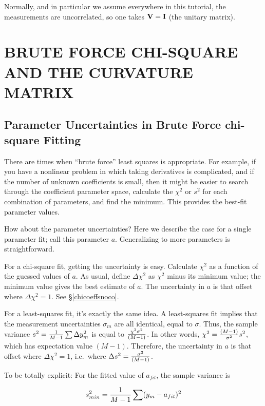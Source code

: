 \documentclass[psfig,preprint]{aastex}
\begin{document}
	Normally, and in particular we assume everywhere in this
tutorial, the measurements are uncorrelated, so one takes ${\bf V} =
{\bf I}$ (the unitary matrix). 


\section{BRUTE FORCE CHI-SQUARE AND THE CURVATURE MATRIX}

\subsection{Parameter Uncertainties in Brute Force chi-square Fitting}

	There are times when ``brute force'' least squares is
appropriate.  For example, if you have a nonlinear problem in which
taking derivatives is complicated, and if the number of unknown
coefficients is small, then it might be easier to search through the
coefficient parameter space, calculate the $\chi^2$ or $s^2$ for each
combination of parameters, and find the minimum. This provides the
best-fit parameter values. 

	How about the parameter uncertainties? Here we describe the case
for a single parameter fit; call this parameter $a$. Generalizing to
more parameters is straightforward.

	For a chi-square fit, getting the uncertainty is easy. Calculate
$\chi^2$ as a function of the guessed values of $a$. As usual, define
$\Delta \chi^2$ as $\chi^2$ minus its minimum value; the minimum value
gives the best estimate of $a$. The uncertainty in $a$ is that offset
where $\Delta \chi^2 = 1$. See \S \ref{chicoeffsnoco}.

	For a least-squares fit, it's exactly the same idea. A
least-squares fit implies that the measurement uncertainties $\sigma_m$
are all identical, equal to $\sigma$. Thus, the sample variance $s^2 =
{1 \over M-1} \sum \Delta y_m^2$ is equal to $\chi^2 \sigma^2 \over
(M-1)$. In other words, $\chi^2 = {(M-1) \over \sigma^2} s^2$, which has
expectation value $(M-1)$. Therefore, the uncertainty in $a$ is that
offset where $\Delta \chi^2 = 1$, i.e.\ where $\Delta s^2 = {\sigma^2
\over (M-1)}$.

	To be totally explicit: 
For the fitted
value of $a_{fit}$, the sample variance is

\begin{equation}
s_{min}^2 = {1 \over M-1} \sum (y_m - a_{fit})^2
\end{equation}
\end{document}
